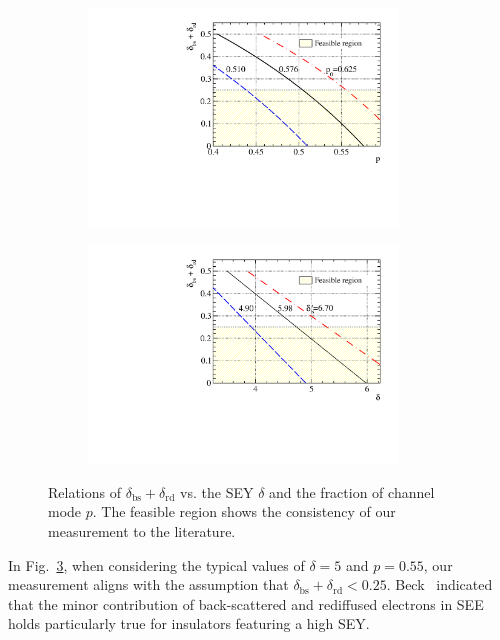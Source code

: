 \begin{figure}[h]
	\centering
	\begin{subfigure}{0.5\textwidth}
		\centering
		\includegraphics[width=0.9\textwidth]{PMTRelated/GTmodel/parameter_pp0.pdf}
		\caption{}
		\label{fig:pp0}
	\end{subfigure}%
	\hfill
	\begin{subfigure}{0.5\textwidth}
		\centering
		\includegraphics[width=0.9\textwidth]{PMTRelated/GTmodel/parameters_ts.pdf}
		\caption{}
		\label{fig:tsts}
	\end{subfigure}
	\caption{Relations of \(\delta_\text{bs} + \delta_\text{rd}\) vs. the SEY \(\delta\) and the fraction of channel mode \(p\).
		The feasible region shows the consistency of our measurement to the literature.}
	\label{fig:pdelta}
\end{figure}

In Fig.~\ref{fig:pdelta}, when considering the typical values of \(\delta = 5\) and \(p = 0.55\), our measurement aligns with the assumption that \(\delta_\text{bs}+\delta_\text{rd}<0.25\). Beck~\cite{beck_physical_1966} indicated that the minor contribution of back-scattered and rediffused electrons in SEE holds particularly true for insulators featuring a high SEY.


